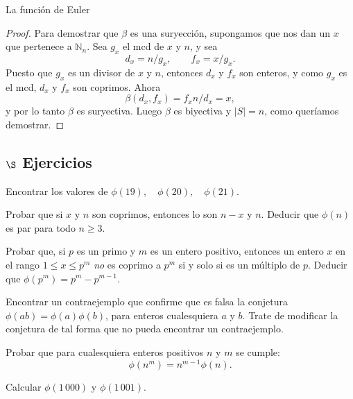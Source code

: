 \begin{section}{La función de Euler}
\begin{proof}
Para demostrar que $\beta$ es una suryección, supongamos que nos dan un $x$ que pertenece a $\mathbb N_n$. Sea $g_x$ el mcd de $x$ y $n$, y sea
$$
d_x = n/g_x, \qquad f_x = x /g_x.
$$
Puesto que $g_x$ es un divisor de $x$ y $n$, entonces $d_x$ y $f_x$ son enteros, y como $g_x$ es el mcd, $d_x$ y $f_x$ son coprimos. Ahora
$$
\beta(d_x,f_x) = f_x n/d_x = x,
$$
y por lo tanto $\beta$ es suryectiva.  Luego $\beta$ es biyectiva y $|S|=n$, como queríamos demostrar.
\end{proof}

\subsection*{$\S$ Ejercicios}
\begin{enumex}
\item Encontrar los valores de $\phi(19),\quad \phi(20),\quad \phi(21)$.

\item Probar que si $x$ y $n$ son coprimos, entonces lo son $n-x$ y $n$. Deducir que $\phi(n)$ es par para todo $n \ge 3$.

\item Probar que, si $p$ es un primo y $m$ es un entero positivo, entonces un entero $x$ en el rango $1 \le x \le p^m$ \textit{no} es coprimo a $p^m$ si y solo si es un múltiplo de $p$. Deducir que $\phi(p^m) = p^m - p^{m-1}$.

\item Encontrar un contraejemplo que confirme que es falsa la conjetura $\phi(ab)= \phi(a)\phi(b)$, para enteros cualesquiera $a$ y $b$. Trate de modificar la conjetura de tal forma que no pueda
encontrar un contraejemplo. 

\item Probar que para cualesquiera enteros positivos $n$ y $m$ se cumple: 
$$
\phi(n^m) =n^{m-1}\phi(n).
$$

\item Calcular $\phi(1\,000)$ y $\phi(1\,001)$.
\end{enumex}

\end{section}



